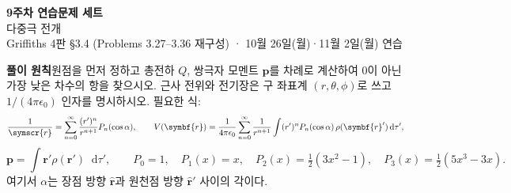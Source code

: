 \documentclass[10pt,a4paper]{article}
\newcommand{\vect}[1]{\symbf{#1}}
\newcommand{\unit}[1]{\hat{\symbf{#1}}}
\newcommand{\dd}{\mathop{}\!\mathrm{d}}
\newcommand{\sepR}{\symscr{r}}
\begin{document}
\begin{center}
  {\LARGE\bfseries\color{navy}9주차 연습문제 세트}\\[1.5mm]
  {\large 다중극 전개}\\[1mm]
  {\small Griffiths 4판 §3.4 (Problems 3.27--3.36 재구성) · 10월 26일(월)·11월 2일(월) 연습}
\end{center}
\begin{infobox}
\textbf{풀이 원칙}\quad 원점을 먼저 정하고 총전하 $Q$, 쌍극자 모멘트 $\vect p$를 차례로 계산하여 0이 아닌 가장 낮은 차수의 항을 찾으시오. 근사 전위와 전기장은 구 좌표계 $(r,\theta,\phi)$로 쓰고 $1/(4\pi\epsilon_0)$ 인자를 명시하시오. 필요한 식:
\[
\frac{1}{\sepR}=\sum_{n=0}^{\infty}\frac{(r')^n}{r^{n+1}}P_n(\cos\alpha),\qquad
V(\vect r)=\frac{1}{4\pi\epsilon_0}\sum_{n=0}^{\infty}\frac{1}{r^{n+1}}\int (r')^nP_n(\cos\alpha)\,\rho(\vect r')\dd\tau',
\]
\[
\vect p=\int \vect r'\rho(\vect r')\dd\tau',\qquad
P_0=1,\quad P_1(x)=x,\quad P_2(x)=\tfrac12(3x^2-1),\quad P_3(x)=\tfrac12(5x^3-3x).
\]
여기서 $\alpha$는 장점 방향 $\unit r$과 원천점 방향 $\unit r'$ 사이의 각이다.
\end{infobox}
\end{document}
